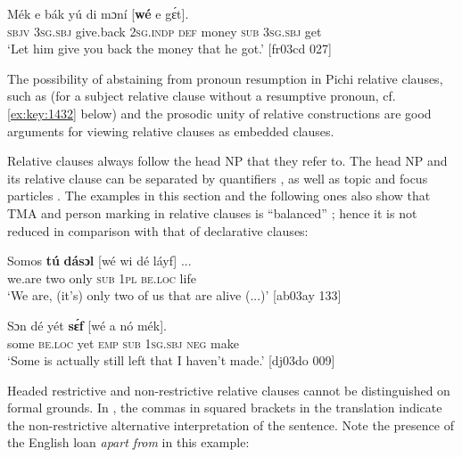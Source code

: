\ea%
    \label{ex:key:1421}
    \gll Mék    e    bák      yú    di  mɔní  [\textbf{wé}  e    gɛ́t].\\
\textsc{sbjv}    \textsc{3sg.sbj}  give.back  \textsc{2sg.indp}  \textsc{def}  money  \phantom{[}\textsc{sub}  \textsc{3sg.sbj}  get\\

\glt ‘Let him give you back the money that he got.’ [fr03cd 027]
\z

The possibility of abstaining from pronoun resumption in Pichi relative clauses, such as  (for a subject relative clause without a resumptive pronoun, cf. \ref{ex:key:1432} below) and the prosodic unity of relative constructions are good arguments for viewing relative clauses as embedded clauses.


Relative clauses always follow the head \textsc{NP} that they refer to. The head \textsc{NP} and its relative clause can be separated by quantifiers , as well as topic and focus particles . The examples in this section and the following ones also show that TMA and person marking in relative clauses is “balanced” \citep{Stassen1985}; hence it is not reduced in comparison with that of declarative clauses:



\ea%
    \label{ex:key:1422}
    \gll Somos  \textbf{tú}  \textbf{dásɔl}  [wé  wi  dé    láyf]    \op...\cp{}\\
we.are  two  only     \textsc{sub}  \textsc{1pl}  \textsc{be.loc}  life\\

\glt ‘We are, (it’s) only two of us that are alive (...)’ [ab03ay 133]
\z


\ea%
    \label{ex:key:1423}
    \gll Sɔn    dé    yét  \textbf{sɛ́f}  [wé  a    nó  mék].\\
some  \textsc{be.loc}  yet  \textsc{emp}   \textsc{sub}  \textsc{1sg.sbj}  \textsc{neg}  make\\

\glt ‘Some is actually still left that I haven’t made.’ [dj03do 009]
\z

Headed restrictive and non-restrictive relative clauses cannot be distinguished on formal grounds. In , the commas in squared brackets in the translation indicate the non-restrictive alternative interpretation of the sentence. Note the presence of the English loan \textit{apart from} in this example: 


